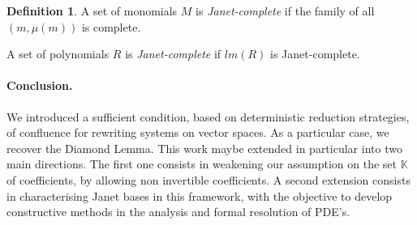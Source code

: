 \documentclass[10pt]{easychair}
\theoremstyle{definition}
\newtheorem{definition}[theorem]{Definition}
\newcommand\K{\mathbb{K}}
\begin{document}
 \begin{definition}
   A set of monomials $M$ is \emph{Janet-complete} if the family of all $(m,\mu(m))$ is complete.

   A set of polynomials $R$ is \emph{Janet-complete} if $lm(R)$ is Janet-complete.
\end{definition}




\paragraph{Conclusion.} We introduced a sufficient condition, based on deterministic reduction strategies, of confluence for rewriting systems on vector spaces. As a particular case, we recover the Diamond Lemma. This work maybe extended in particular into two main directions. The first one consists in weakening our assumption on the set $\K$ of coefficients, by allowing non invertible coefficients. A second extension consists in characterising Janet bases in this framework, with the objective to develop constructive methods in the analysis and formal resolution of PDE's.


\end{document}
